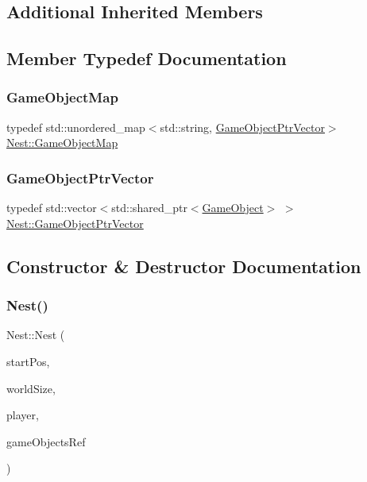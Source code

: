 \subsection*{Additional Inherited Members}


\subsection{Member Typedef Documentation}
\mbox{\label{class_nest_ace85746dc6b1b17dd63dd22c48082e4c}} 
\subsubsection{\texorpdfstring{Game\+Object\+Map}{GameObjectMap}}
{\footnotesize\ttfamily typedef std\+::unordered\+\_\+map$<$std\+::string, \hyperlink{class_nest_a75b288e175b0c96fe143e536ffe39b9f}{Game\+Object\+Ptr\+Vector}$>$ \hyperlink{class_nest_ace85746dc6b1b17dd63dd22c48082e4c}{Nest\+::\+Game\+Object\+Map}}

\mbox{\label{class_nest_a75b288e175b0c96fe143e536ffe39b9f}} 
\subsubsection{\texorpdfstring{Game\+Object\+Ptr\+Vector}{GameObjectPtrVector}}
{\footnotesize\ttfamily typedef std\+::vector$<$std\+::shared\+\_\+ptr$<$\hyperlink{class_game_object}{Game\+Object}$>$ $>$ \hyperlink{class_nest_a75b288e175b0c96fe143e536ffe39b9f}{Nest\+::\+Game\+Object\+Ptr\+Vector}}



\subsection{Constructor \& Destructor Documentation}
\mbox{\label{class_nest_a2ff01e11d59383d9121c836ea3eb966b}} 
\subsubsection{\texorpdfstring{Nest()}{Nest()}}
{\footnotesize\ttfamily Nest\+::\+Nest (\begin{DoxyParamCaption}\item[{const sf\+::\+Vector2f \&}]{start\+Pos,  }\item[{const sf\+::\+Vector2f \&}]{world\+Size,  }\item[{std\+::shared\+\_\+ptr$<$ \hyperlink{class_game_object}{Game\+Object} $>$}]{player,  }\item[{\hyperlink{class_nest_ace85746dc6b1b17dd63dd22c48082e4c}{Game\+Object\+Map} \&}]{game\+Objects\+Ref }\end{DoxyParamCaption})}


